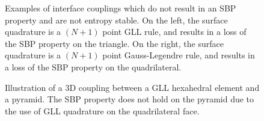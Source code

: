 \documentclass[preprint,10pt]{elsarticle}
\theoremstyle{definition}
\theoremstyle{lemma}
\theoremstyle{corollary}
\theoremstyle{theorem}
\theoremstyle{assumption}
\begin{document}
\begin{figure}
\centering
\begingroup
\captionsetup[subfigure]{width=.43\textwidth}
\endgroup
\hspace{2em}
\caption{Examples of interface couplings which do not result in an SBP property and are not entropy stable.  On the left, the surface quadrature is a $(N+1)$ point GLL rule, and results in a loss of the SBP property on the triangle.  On the right, the surface quadrature is a $(N+1)$ point Gauss-Legendre rule, and results in a loss of the SBP property on the quadrilateral.  }
\label{fig:hybrid}
\end{figure}

\begin{figure}
\centering
{}
\hspace{2em}
\caption{Illustration of a 3D coupling between a GLL hexahedral element and a pyramid.  The SBP property does not hold on the pyramid due to the use of GLL quadrature on the quadrilateral face. }
\label{fig:hybrid3d}
\end{figure}
\end{document}
